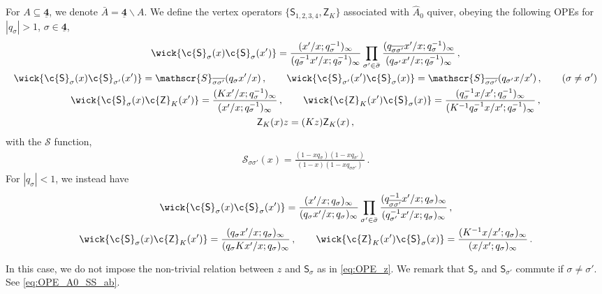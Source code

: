 \begin{definition}\label{def:OPEs_A0}
    For $A \subseteq \underline{\mathbf{4}}$, we denote $\bar{A} = \underline{\mathbf{4}} \backslash A$.
    We define the vertex operators $\{\mathsf{S}_{1,2,3,4}, \mathsf{Z}_K\}$ associated with $\widehat{A}_0$ quiver, obeying the following OPEs for $|q_\sigma|>1$, $\sigma \in \underline{\textbf{4}}$,
 \begin{subequations}\label{eq:OPE_A0}
    \begin{gather}
        \wick{ \c {\mathsf{S}}_\sigma(x) \c {\mathsf{S}}_\sigma(x') } = 
        \frac{(x'/x;q_\sigma^{-1})_\infty}{(q_\sigma^{-1} x'/x;q_\sigma^{-1})_\infty}
        \prod_{\sigma' \in \bar{\sigma}} 
        \frac{(q_{\overline{\sigma\sigma'}} x'/x;q_\sigma^{-1})_\infty}{(q_{\sigma'} x'/x;q_\sigma^{-1})_\infty}
        \, , \label{eq:OPE_A0_SS} \\
        \wick{ \c {\mathsf{S}}_\sigma(x) \c {\mathsf{S}}_{\sigma'}(x') } = \mathscr{S}_{\overline{\sigma\sigma'}}(q_\sigma x'/x)
        \, , \qquad 
        \wick{ \c {\mathsf{S}}_{\sigma'}(x') \c {\mathsf{S}}_\sigma(x) } = \mathscr{S}_{\overline{\sigma\sigma'}}(q_{\sigma'} x/x')
        \, , \qquad (\sigma \neq \sigma') \label{eq:OPE_A0_SS_ab} \\
        \wick{ \c {\mathsf{S}}_\sigma(x) \c {\mathsf{Z}}_K(x') } = \frac{(K x'/x;q_\sigma^{-1})_\infty}{(x'/x;q_\sigma^{-1})_\infty}
        \, , \qquad 
        \wick{ \c {\mathsf{Z}}_K(x') \c {\mathsf{S}}_\sigma(x) } = \frac{(q_\sigma^{-1} x/x';q_\sigma^{-1})_\infty}{(K^{-1} q_\sigma^{-1}x/x';q_\sigma^{-1})_\infty} \, , \\
        \mathsf{Z}_K(x) z = (K z) \mathsf{Z}_K(x) \, ,
    \end{gather}
 \end{subequations}
 with the $\mathscr{S}$ function,
 \begin{align}
     \mathscr{S}_{\sigma\sigma'}(x) = \frac{(1 - x q_{\sigma})(1 - x q_{\sigma'})}{(1 - x)(1 - x q_{\sigma\sigma'})}
     \, .
 \end{align}
 For $|q_\sigma| < 1$, we instead have
 \begin{subequations}
 \begin{gather}
        \wick{ \c {\mathsf{S}}_\sigma(x) \c {\mathsf{S}}_\sigma(x') } = \frac{(x'/x;q_\sigma)_\infty}{(q_\sigma x'/x;q_\sigma)_\infty}
        \prod_{\sigma' \in \bar{\sigma}} 
        \frac{(q_{\overline{\sigma\sigma'}}^{-1} x'/x;q_\sigma)_\infty}{(q_{\sigma'}^{-1} x'/x;q_\sigma)_\infty}
        \, , \label{eq:OPE_A0_SS2} \\
        \wick{ \c {\mathsf{S}}_\sigma(x) \c {\mathsf{Z}}_K(x') } = \frac{(q_\sigma x'/x;q_\sigma)_\infty}{(q_\sigma K x'/x;q_\sigma)_\infty}
        \, , \qquad 
        \wick{ \c {\mathsf{Z}}_K(x') \c {\mathsf{S}}_\sigma(x) } = \frac{(K^{-1} x/x';q_\sigma)_\infty}{(x/x';q_\sigma)_\infty} \, .
 \end{gather}
 \end{subequations}
\end{definition}
In this case, we do not impose the non-trivial relation between $z$ and $\mathsf{S}_\sigma$ as in \eqref{eq:OPE_z}.
We remark that $\mathsf{S}_\sigma$ and $\mathsf{S}_{\sigma'}$ commute if $\sigma \neq \sigma'$.
See \eqref{eq:OPE_A0_SS_ab}.
    
